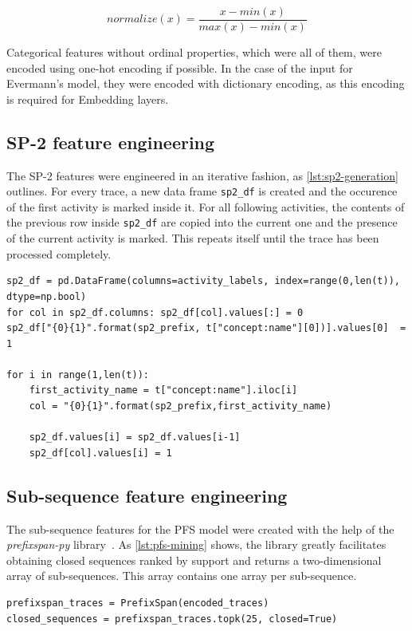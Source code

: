 $$normalize(x) = \frac{x-min(x)}{max(x)-min(x)}$$

Categorical features without ordinal properties, which were all of them, were encoded using one-hot encoding if possible. In the case of the input for Evermann's model, they were encoded with dictionary encoding, as this encoding is required for Embedding layers.

\subsection*{SP-2 feature engineering}
The SP-2 features were engineered in an iterative fashion, as \autoref{lst:sp2-generation} outlines. For every trace, a new data frame \texttt{sp2\_df} is created and the occurence of the first activity is marked inside it. For all following activities, the contents of the previous row inside \texttt{sp2\_df} are copied into the current one and the presence of the current activity is marked. This repeats itself until the trace has been processed completely.

\begin{lstlisting}[caption={SP-2 feature generation algorithm for a single trace},label={lst:sp2-generation}]
sp2_df = pd.DataFrame(columns=activity_labels, index=range(0,len(t)), dtype=np.bool)
for col in sp2_df.columns: sp2_df[col].values[:] = 0
sp2_df["{0}{1}".format(sp2_prefix, t["concept:name"][0])].values[0]  = 1

for i in range(1,len(t)):
    first_activity_name = t["concept:name"].iloc[i]
    col = "{0}{1}".format(sp2_prefix,first_activity_name)
    
    sp2_df.values[i] = sp2_df.values[i-1]
    sp2_df[col].values[i] = 1
\end{lstlisting}

\subsection*{Sub-sequence feature engineering}
The sub-sequence features for the PFS model were created with the help of the \textit{prefixspan-py} library~\cite{web:prefixspan-py}. As \autoref{lst:pfs-mining} shows, the library greatly facilitates obtaining closed sequences ranked by support and returns a two-dimensional array of sub-sequences. This array contains one array per sub-sequence.

\begin{lstlisting}[caption={Obtaining closed sequences using the \textit{prefixspan-py} library.}, label={lst:pfs-mining}]
prefixspan_traces = PrefixSpan(encoded_traces)
closed_sequences = prefixspan_traces.topk(25, closed=True)
\end{lstlisting}

